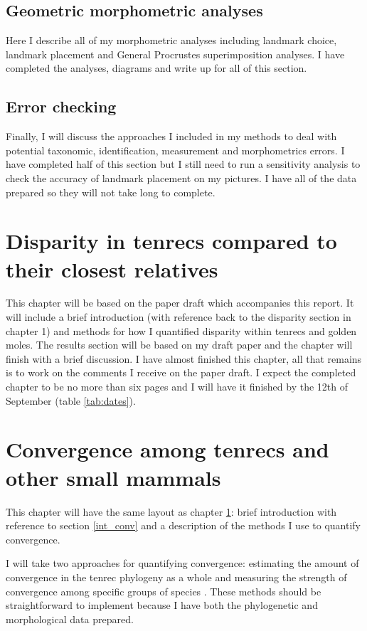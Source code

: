 \documentclass[12pt,a4paper]{article}
\begin{document}
	\subsection{Geometric morphometric analyses}
		Here I describe all of my morphometric analyses including landmark choice, landmark placement and General Procrustes superimposition analyses. I have completed the analyses, diagrams and write up for all of this section.
		
	\subsection{Error checking}
		Finally, I will discuss the approaches I included in my methods to deal with potential taxonomic, identification, measurement and morphometrics errors. I have completed half of this section but I still need to run a sensitivity analysis to check the accuracy of landmark placement on my pictures. I have all of the data prepared so they will not take long to complete.

\section{Disparity in tenrecs compared to their closest relatives}
	\label{sect_disp}
	This chapter will be based on the paper draft which accompanies this report. It will include a brief introduction (with reference back to the disparity section  in chapter 1) and methods for how I quantified disparity within tenrecs and golden moles. The results section will be based on my draft paper and the chapter will finish with a brief discussion.
	I have almost finished this chapter, all that remains is to work on the comments I receive on the paper draft. I expect the completed chapter to be no more than six pages and I will have it finished by the 12th of September (table \ref{tab:dates}).
	

\section{Convergence among tenrecs and other small mammals}
	\label{sect_conv}
	This chapter will have the same layout as chapter \ref{sect_disp}: brief introduction with reference to section \ref{int_conv} and a description of the methods I use to quantify convergence. 
	
	I will take two approaches for quantifying convergence: estimating the amount of convergence in the tenrec phylogeny as a whole \citep{Stayton2008} and measuring the strength of convergence among specific groups of species \citep{Arbuckle2014}. These methods should be straightforward to implement because I have both the phylogenetic and morphological data prepared. 
		
\end{document}
